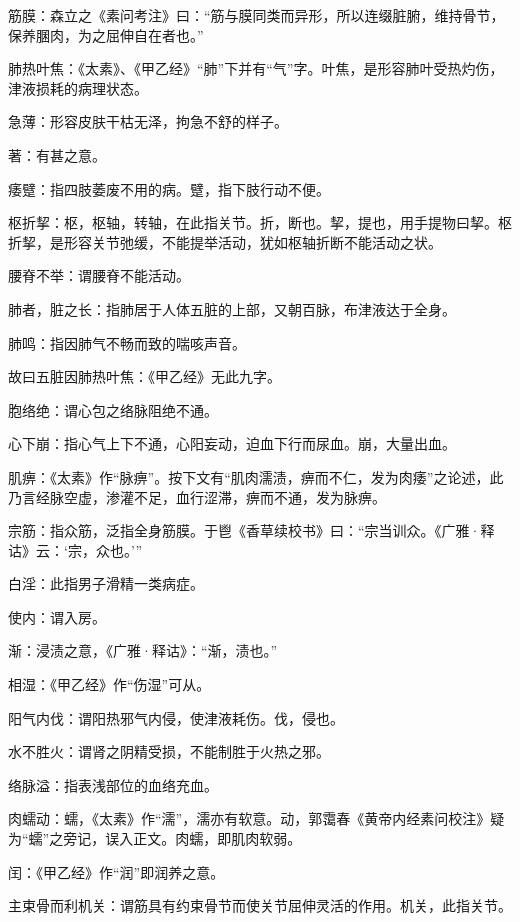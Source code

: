 \documentclass[draft,12pt]{ctexbook}
\begin{document}

\begin{jiaozhu}
	\item 筋膜：森立之《素问考注》曰：“筋与膜同类而异形，所以连缀脏腑，维持骨节，保养䐃肉，为之屈伸自在者也。”
	\item 肺热叶焦：《太素》、《甲乙经》“肺”下并有“气”字。叶焦，是形容肺叶受热灼伤，津液损耗的病理状态。
	\item 急薄：形容皮肤干枯无泽，拘急不舒的样子。
	\item 著：有甚之意。
	\item 痿躄：指四肢萎废不用的病。躄，指下肢行动不便。
	\item 枢折挈：枢，枢轴，转轴，在此指关节。折，断也。挈，提也，用手提物曰挈。枢折挈，是形容关节弛缓，不能提举活动，犹如枢轴折断不能活动之状。
	\item 腰脊不举：谓腰脊不能活动。
	\item 肺者，脏之长：指肺居于人体五脏的上部，又朝百脉，布津液达于全身。
	\item 肺鸣：指因肺气不畅而致的喘咳声音。
	\item 故曰五脏因肺热叶焦：《甲乙经》无此九字。
	\item 胞络绝：谓心包之络脉阻绝不通。
	\item 心下崩：指心气上下不通，心阳妄动，迫血下行而尿血。崩，大量出血。
	\item 肌痹：《太素》作“脉痹”。按下文有“肌肉濡渍，痹而不仁，发为肉痿”之论述，此乃言经脉空虚，渗灌不足，血行涩滞，痹而不通，发为脉痹。
	\item 宗筋：指众筋，泛指全身筋膜。于鬯《香草续校书》曰：“宗当训众。《广雅·释诂》云：‘宗，众也。’”
	\item 白淫：此指男子滑精一类病症。
	\item 使内：谓入房。
	\item 渐：浸渍之意，《广雅·释诂》：“渐，渍也。”
	\item 相湿：《甲乙经》作“伤湿”可从。
	\item 阳气内伐：谓阳热邪气内侵，使津液耗伤。伐，侵也。
	\item 水不胜火：谓肾之阴精受损，不能制胜于火热之邪。
	\item 络脉溢：指表浅部位的血络充血。
	\item 肉蠕动：蠕，《太素》作“濡”，濡亦有软意。动，郭霭春《黄帝内经素问校注》疑为“蠕”之旁记，误入正文。肉蠕，即肌肉软弱。
	\item 闰：《甲乙经》作“润”即润养之意。
	\item 主束骨而利机关：谓筋具有约束骨节而使关节屈伸灵活的作用。机关，此指关节。

\end{jiaozhu}
\end{document}
